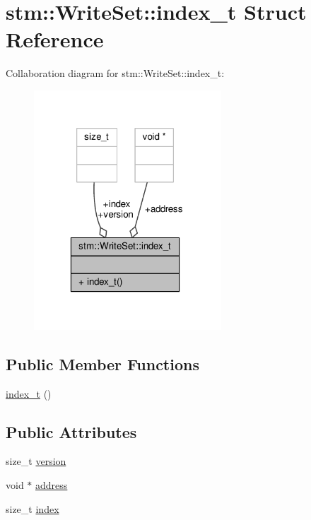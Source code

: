 \hypertarget{structstm_1_1WriteSet_1_1index__t}{\section{stm\-:\-:Write\-Set\-:\-:index\-\_\-t Struct Reference}
\label{structstm_1_1WriteSet_1_1index__t}
}


Collaboration diagram for stm\-:\-:Write\-Set\-:\-:index\-\_\-t\-:
\nopagebreak
\begin{figure}[H]
\begin{center}
\leavevmode
\includegraphics[width=199pt]{structstm_1_1WriteSet_1_1index__t__coll__graph}
\end{center}
\end{figure}
\subsection*{Public Member Functions}
\begin{DoxyCompactItemize}
\item 
\hyperlink{structstm_1_1WriteSet_1_1index__t_a423a89547475106dda1dcf84080f2583}{index\-\_\-t} ()
\end{DoxyCompactItemize}
\subsection*{Public Attributes}
\begin{DoxyCompactItemize}
\item 
size\-\_\-t \hyperlink{structstm_1_1WriteSet_1_1index__t_a8ef0597ef92dd865e674c027c81cce5c}{version}
\item 
void $\ast$ \hyperlink{structstm_1_1WriteSet_1_1index__t_aae0e6fec094d289e7aee22177f14da84}{address}
\item 
size\-\_\-t \hyperlink{structstm_1_1WriteSet_1_1index__t_a58b503e651048d187bfe9fe77897433c}{index}
\end{DoxyCompactItemize}


